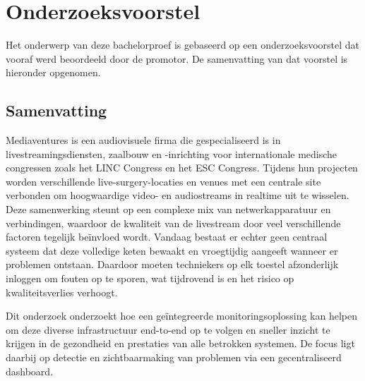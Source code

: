 \documentclass[dutch,dit,thesis]{hogentreport}
\begin{document}








\appendix

\chapter{Onderzoeksvoorstel}

Het onderwerp van deze bachelorproef is gebaseerd op een onderzoeksvoorstel dat vooraf werd beoordeeld door de promotor. De samenvatting van dat voorstel is hieronder opgenomen.

\section*{Samenvatting}

Mediaventures is een audiovisuele firma die gespecialiseerd is in livestreamingsdiensten, zaalbouw en -inrichting voor internationale medische congressen zoals het LINC Congress en het ESC Congress. Tijdens hun projecten worden verschillende live-surgery-locaties en venues met een centrale site verbonden om hoogwaardige video- en audiostreams in realtime uit te wisselen. Deze samenwerking steunt op een complexe mix van netwerkapparatuur en verbindingen, waardoor de kwaliteit van de livestream door veel verschillende factoren tegelijk beïnvloed wordt. Vandaag bestaat er echter geen centraal systeem dat deze volledige keten bewaakt en vroegtijdig aangeeft wanneer er problemen ontstaan. Daardoor moeten techniekers op elk toestel afzonderlijk inloggen om fouten op te sporen, wat tijdrovend is en het risico op kwaliteitsverlies verhoogt.

Dit onderzoek onderzoekt hoe een geïntegreerde monitoringsoplossing kan helpen om deze diverse infrastructuur end-to-end op te volgen en sneller inzicht te krijgen in de gezondheid en prestaties van alle betrokken systemen. De focus ligt daarbij op detectie en zichtbaarmaking van problemen via een gecentraliseerd dashboard.






\backmatter{}

\setlength\bibitemsep{2pt} %
\printbibliography[heading=bibintoc]
\end{document}
